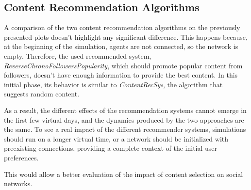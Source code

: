 \subsection{Content Recommendation Algorithms}
A comparison of the two content recommendation algorithms on the previously presented plots doesn't highlight any significant difference.
This happens because, at the beginning of the simulation, agents are not connected, so the network is empty.
Therefore, the used recommended system, \textit{ReverseChronoFollowersPopularity}, which should promote popular content from followers, doesn't have enough information to provide the best content.
In this initial phase, its behavior is similar to \textit{ContentRecSys}, the algorithm that suggests random content.

As a result, the different effects of the recommendation systems cannot emerge in the first few virtual days, and the dynamics produced by the two approaches are the same.
To see a real impact of the different recommender systems, simulations should run on a longer virtual time, or a network should be initialized with preexisting connections, providing a complete context of the initial user preferences.

This would allow a better evaluation of the impact of content selection on social networks.